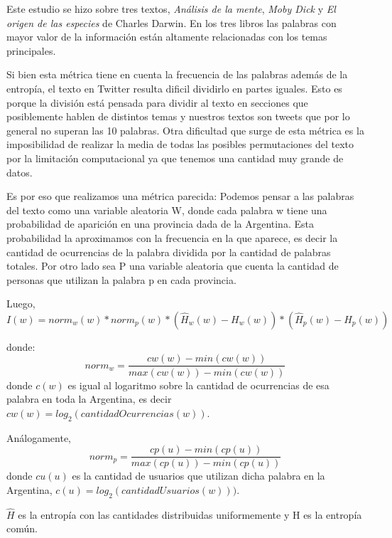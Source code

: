 Este estudio se hizo sobre tres textos, \textit{Análisis de la mente}, 
\textit{Moby Dick} y \textit{El origen de las especies} de Charles Darwin. 
En los tres libros las palabras con mayor valor de la información están 
altamente relacionadas con los temas principales.

Si bien esta métrica tiene en cuenta la frecuencia de las palabras además de la 
entropía, el texto en Twitter resulta dificil dividirlo en partes iguales. 
Esto es porque la división está pensada para dividir al texto en secciones que 
posiblemente hablen de distintos temas y nuestros textos son tweets que por lo general no superan las 10 palabras.
Otra dificultad que surge de esta métrica es la imposibilidad de realizar la media 
de todas las posibles permutaciones del texto por la limitación computacional ya que 
tenemos una cantidad muy grande de datos.

Es por eso que realizamos una métrica parecida:
Podemos pensar a las palabras del texto como una variable aleatoria W, donde cada palabra w tiene una probabilidad de aparición en una provincia dada de la Argentina. Esta probabilidad la aproximamos con la frecuencia en la que aparece, es decir la cantidad de ocurrencias de la palabra dividida por la cantidad de palabras totales.
Por otro lado sea P una variable aleatoria que cuenta la cantidad de personas que 
utilizan la palabra p en cada provincia.

Luego,
\begin{equation}
I(w) =  norm_{w}(w) * norm_{p}(w) * (\widehat{H}_{w}(w) - H_{w}(w)) * (\widehat{H}_{p}(w) - H_{p}(w))
\end{equation}

donde:
\begin{equation}
norm_{w} = \frac{cw(w)- min(cw(w))}{max(cw(w)) - min(cw(w))}    
\end{equation}
donde $c(w)$ es igual al logaritmo sobre la cantidad de ocurrencias de esa palabra en toda la Argentina, es decir $cw(w) = log_2(cantidadOcurrencias(w))$.

Análogamente,
\begin{equation}
norm_{p} = \frac{cp(u)- min(cp(u))}{max(cp(u)) - min(cp(u))}
\end{equation}
donde $cu(u)$ es la cantidad de usuarios que utilizan dicha palabra en la Argentina, $c(u)= log_2(cantidadUsuarios(w)))$.


$\widehat{H}$ es la entropía con las cantidades distribuidas uniformemente y H es la entropía común.

